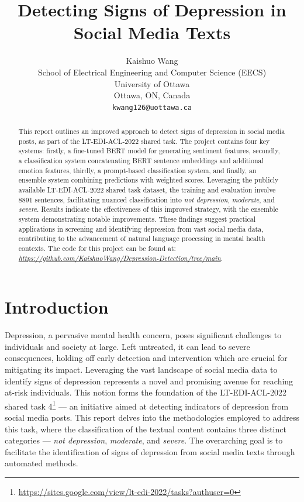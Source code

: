 \documentclass{article}
\title{Detecting Signs of Depression in Social Media Texts}
\author{%
  Kaishuo Wang\\
  School of Electrical Engineering and Computer Science (EECS)\\
  University of Ottawa\\
  Ottawa, ON, Canada \\
  \texttt{kwang126@uottawa.ca} \\
}
\begin{document}
\maketitle

\begin{abstract}
  This report outlines an improved approach to detect signs of depression in social media posts, as part of the LT-EDI-ACL-2022 shared task. The project contains four key systems: firstly, a fine-tuned BERT model for generating sentiment features, secondly, a classification system concatenating BERT sentence embeddings and additional emotion features, thirdly, a prompt-based classification system, and finally, an ensemble system combining predictions with weighted scores. Leveraging the publicly available LT-EDI-ACL-2022 shared task dataset, the training and evaluation involve 8891 sentences, facilitating nuanced classification into \emph{not depression}, \emph{moderate}, and \emph{severe}. Results indicate the effectiveness of this improved strategy, with the ensemble system demonstrating notable improvements. These findings suggest practical applications in screening and identifying depression from vast social media data, contributing to the advancement of natural language processing in mental health contexts. The code for this project can be found at: \emph{\url{https://github.com/KaishuoWang/Depression-Detection/tree/main}}.
\end{abstract}

\section{Introduction}

Depression, a pervasive mental health concern, poses significant challenges to individuals and society at large. Left untreated, it can lead to severe consequences, holding off early detection and intervention which are crucial for mitigating its impact. Leveraging the vast landscape of social media data to identify signs of depression represents a novel and promising avenue for reaching at-risk individuals. This notion forms the foundation of the LT-EDI-ACL-2022 shared task 4\footnote{\url{https://sites.google.com/view/lt-edi-2022/tasks?authuser=0}} — an initiative aimed at detecting indicators of depression from social media posts. This report delves into the methodologies employed to address this task, where the classification of the textual content contains three distinct categories — \emph{not depression}, \emph{moderate}, and \emph{severe}. The overarching goal is to facilitate the identification of signs of depression from social media texts through automated methods.
\end{document}
